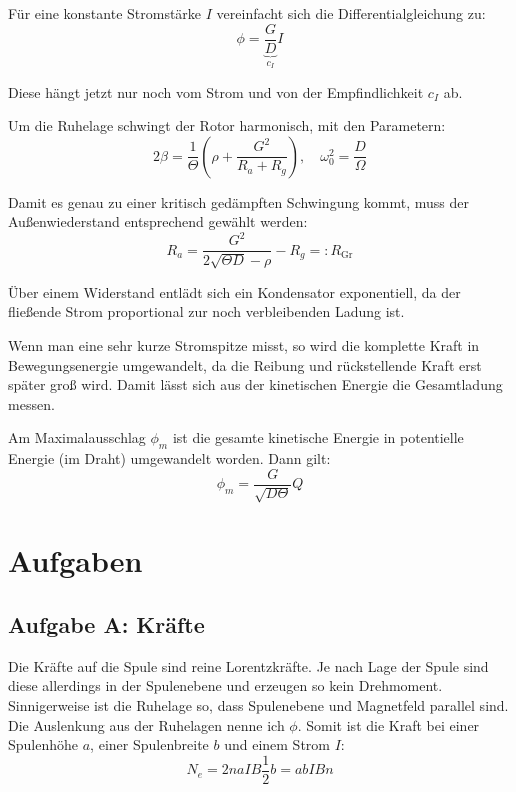 \documentclass[11pt, ngerman]{article}
\newcommand{\half}{\frac{1}{2}}
\begin{document}
Für eine konstante Stromstärke $I$ vereinfacht sich die Differentialgleichung
zu:
\[ \phi = \underbrace{\frac GD}_{c_I} I \]

Diese hängt jetzt nur noch vom Strom und von der Empfindlichkeit $c_I$ ab.

Um die Ruhelage schwingt der Rotor harmonisch, mit den Parametern:
\[
	2 \beta = \frac 1 \Theta \left( \rho + \frac{G^2}{R_a + R_g} \right)
	, \quad
	\omega_0^2 = \frac D \Omega
\]

Damit es genau zu einer kritisch gedämpften Schwingung kommt, muss der
Außenwiederstand entsprechend gewählt werden:
%
\begin{equation}
	\label{eq:243.17}
	R_a = \frac{G^2}{2 \sqrt{\Theta D} - \rho} - R_g =: R_\text{Gr}
\end{equation}

Über einem Widerstand entlädt sich ein Kondensator exponentiell, da der
fließende Strom proportional zur noch verbleibenden Ladung ist.

Wenn man eine sehr kurze Stromspitze misst, so wird die komplette Kraft in
Bewegungsenergie umgewandelt, da die Reibung und rückstellende Kraft erst
später groß wird. Damit lässt sich aus der kinetischen Energie die Gesamtladung
messen.

Am Maximalausschlag $\phi_m$ ist die gesamte kinetische Energie in potentielle
Energie (im Draht) umgewandelt worden. Dann gilt:
\[ \phi_m = \frac G{\sqrt{D \Theta}} Q \]


\section{Aufgaben}

\subsection{Aufgabe A: Kräfte}

Die Kräfte auf die Spule sind reine Lorentzkräfte. Je nach Lage der Spule sind
diese allerdings in der Spulenebene und erzeugen so kein Drehmoment.
Sinnigerweise ist die Ruhelage so, dass Spulenebene und Magnetfeld parallel
sind. Die Auslenkung aus der Ruhelagen nenne ich $\phi$. Somit ist die Kraft
bei einer Spulenhöhe $a$, einer Spulenbreite $b$ und einem Strom $I$:
\[ N_e = 2 n a I B \half b = abIBn \]
\end{document}
